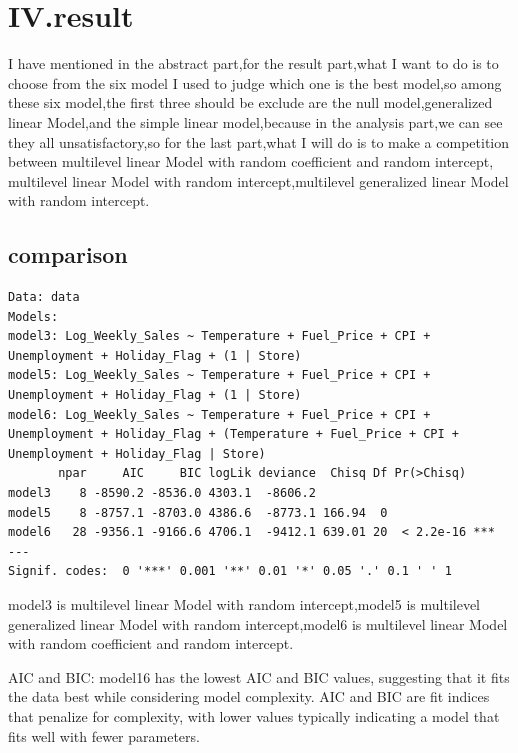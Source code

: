 \documentclass[
  letterpaper,
  DIV=11,
  numbers=noendperiod]{scrartcl}
\begin{document}
\hypertarget{iv.result}{%
\section{IV.result}\label{iv.result}}

I have mentioned in the abstract part,for the result part,what I want to
do is to choose from the six model I used to judge which one is the best
model,so among these six model,the first three should be exclude are the
null model,generalized linear Model,and the simple linear model,because
in the analysis part,we can see they all unsatisfactory,so for the last
part,what I will do is to make a competition between multilevel linear
Model with random coefficient and random intercept, multilevel linear
Model with random intercept,multilevel generalized linear Model with
random intercept.

\hypertarget{comparison}{%
\subsection{comparison}\label{comparison}}

\begin{verbatim}
Data: data
Models:
model3: Log_Weekly_Sales ~ Temperature + Fuel_Price + CPI + Unemployment + Holiday_Flag + (1 | Store)
model5: Log_Weekly_Sales ~ Temperature + Fuel_Price + CPI + Unemployment + Holiday_Flag + (1 | Store)
model6: Log_Weekly_Sales ~ Temperature + Fuel_Price + CPI + Unemployment + Holiday_Flag + (Temperature + Fuel_Price + CPI + Unemployment + Holiday_Flag | Store)
       npar     AIC     BIC logLik deviance  Chisq Df Pr(>Chisq)    
model3    8 -8590.2 -8536.0 4303.1  -8606.2                         
model5    8 -8757.1 -8703.0 4386.6  -8773.1 166.94  0               
model6   28 -9356.1 -9166.6 4706.1  -9412.1 639.01 20  < 2.2e-16 ***
---
Signif. codes:  0 '***' 0.001 '**' 0.01 '*' 0.05 '.' 0.1 ' ' 1
\end{verbatim}

model3 is multilevel linear Model with random intercept,model5 is
multilevel generalized linear Model with random intercept,model6 is
multilevel linear Model with random coefficient and random intercept.

AIC and BIC: model16 has the lowest AIC and BIC values, suggesting that
it fits the data best while considering model complexity. AIC and BIC
are fit indices that penalize for complexity, with lower values
typically indicating a model that fits well with fewer parameters.
\end{document}
